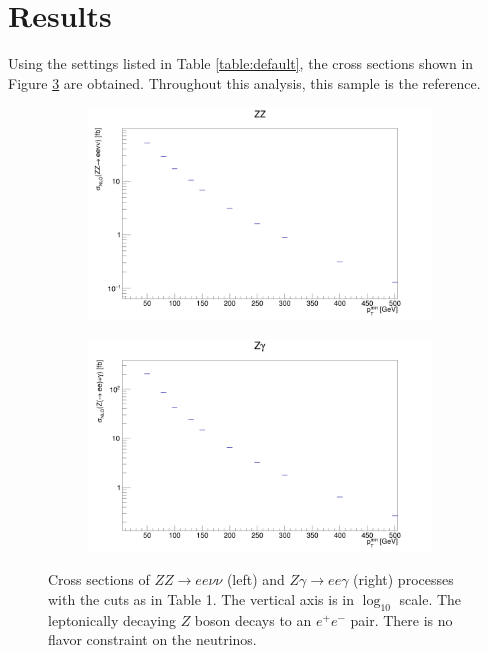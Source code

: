\documentclass[11pt,a4paper]{report}
\begin{document}
\section{Results}
Using the settings listed in Table \ref{table:default}, the cross sections shown in Figure \ref{xsecs} are obtained. Throughout this analysis, this sample is the reference.
\begin{figure}[H]
\centering
	\begin{subfigure}{0.49\textwidth}
		\includegraphics[width=\linewidth]{ZZ_xsec.png}
		\caption{}
		\label{subfig:ZeeZvv}
	\end{subfigure}	
	\begin{subfigure}{0.49\textwidth}
		\includegraphics[width=\linewidth]{Zg_xsec.png}
		\caption{}
		\label{subfig:Zeeg}	
	\end{subfigure}
	\caption{Cross sections of $ZZ\to ee\nu\nu$ (left) and $Z\gamma\to ee\gamma$ (right) processes with the cuts as in Table 1. The vertical axis is in $\log_{10}$ scale. The leptonically decaying $Z$ boson decays to an $e^+e^-$ pair. There is no flavor constraint on the neutrinos.}
	\label{xsecs}
\end{figure}
\end{document}
